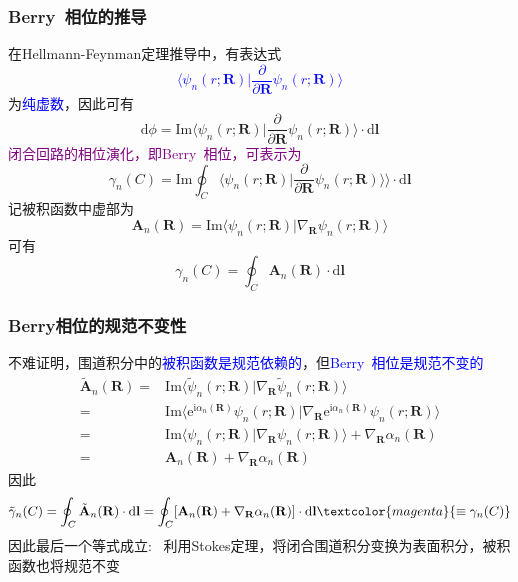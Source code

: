 \frame
{
	\frametitle{\textrm{Berry~}相位的推导}
	在\textrm{Hellmann-Feynman}定理推导中，有表达式
	\textcolor{blue}{\begin{displaymath}
		\langle\psi_n(r;\mathbf{R})|\dfrac{\partial}{\partial\mathbf{R}}\psi_n(r;\mathbf{R})\rangle
	\end{displaymath}}
	为\textcolor{blue}{纯虚数}，因此可有
	\begin{displaymath}
		\mathrm{d}\phi=\mathrm{Im}\langle\psi_n(r;\mathbf{R})|\dfrac{\partial}{\partial\mathbf{R}}\psi_n(r;\mathbf{R})\rangle\cdot\mathrm{d}\mathbf{l}
	\end{displaymath}
	\textcolor{purple}{闭合回路的相位演化，即\textrm{Berry~}相位，可表示为}
	\begin{displaymath}
		\gamma_n(C)=\mathrm{Im}\oint_C\langle\psi_n(r;\mathbf{R})|\dfrac{\partial}{\partial\mathbf{R}}\psi_n(r;\mathbf{R})\rangle\rangle\cdot\mathrm{d}\mathbf{l}
	\end{displaymath}
	记被积函数中虚部为
	\begin{displaymath}
		\mathbf{A}_n(\mathbf{R})=\mathrm{Im}\langle\psi_n(r;\mathbf{R})|\nabla_{\mathbf{R}}\psi_n(r;\mathbf{R})\rangle
	\end{displaymath}
	可有
	\begin{displaymath}
		\gamma_n(C)=\oint_C\mathbf{A}_n(\mathbf{R})\cdot\mathrm{d}\mathbf{l}
	\end{displaymath}
}

\frame
{
	\frametitle{\rm{Berry}相位的规范不变性}
	不难证明，围道积分中的\textcolor{blue}{被积函数是规范依赖的}，但\textcolor{blue}{\textrm{Berry~}相位是规范不变的}
	\begin{displaymath}
		\begin{aligned}
			\tilde{\mathbf{A}}_n(\mathbf{R})=&\mathrm{Im}\langle\tilde{\psi}_n(r;\mathbf{R})|\nabla_{\mathbf{R}}\tilde{\psi}_n(r;\mathbf{R})\rangle\\
			=&\mathrm{Im}\langle\mathrm{e}^{\mathrm{i}\alpha_n(\mathbf{R})}\psi_n(r;\mathbf{R})|\nabla_{\mathbf{R}}\mathrm{e}^{\mathrm{i}\alpha_n(\mathbf{R})}\psi_n(r;\mathbf{R})\rangle\\
			=&\mathrm{Im}\langle\psi_n(r;\mathbf{R})|\nabla_{\mathbf{R}}\psi_n(r;\mathbf{R})\rangle+\nabla_{\mathbf{R}}\alpha_n(\mathbf{R})\\
			=&\mathbf{A}_n(\mathbf{R})+\nabla_{\mathbf{R}}\alpha_n(\mathbf{R})
		\end{aligned}
	\end{displaymath}
	因此
	\begin{displaymath}
		\tilde\gamma_n(C)=\oint_C\tilde{\mathbf{A}}_n(\mathbf{R})\cdot\mathrm{d}\mathbf{l}=\oint_C[\mathbf{A}_n(\mathbf{R})+\nabla_{\mathbf{R}}\alpha_n(\mathbf{R})]\cdot\mathrm{d}\mathbf{l}\textcolor{magenta}{\equiv\gamma_n(C)}
	\end{displaymath}
	因此最后一个等式成立:~\textcolor{blue}{\fontsize{8.2pt}{6.2pt}}
\vskip 5pt
	利用\textrm{Stokes}定理，将闭合围道积分变换为表面积分，被积函数也将规范不变
}

